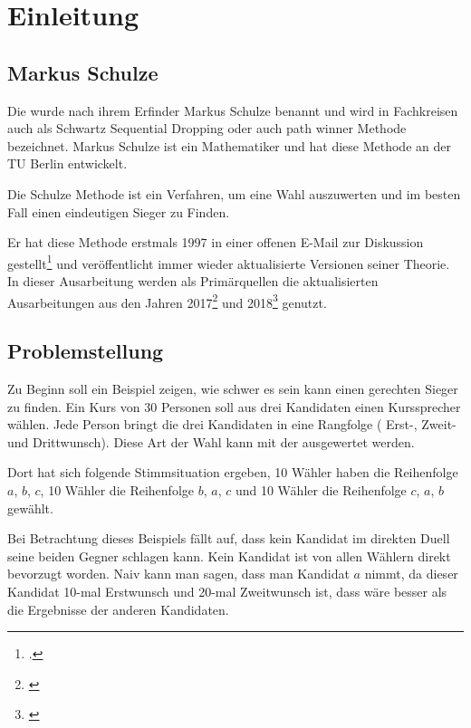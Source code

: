 \section{Einleitung}
\label{sec:Einleitung}


\subsection{Markus Schulze} 
\label{sec:markusSchulze}
Die \schulze wurde nach ihrem Erfinder Markus Schulze benannt und wird in Fachkreisen auch als \glqq Schwartz Sequential Dropping\grqq{} oder auch \glqq path winner\grqq{} Methode bezeichnet. Markus Schulze ist ein Mathematiker und hat diese Methode an der TU Berlin entwickelt.

Die Schulze Methode ist ein Verfahren, um eine Wahl auszuwerten und im besten Fall einen eindeutigen Sieger zu Finden.

Er hat diese Methode erstmals 1997 in einer offenen E-Mail zur Diskussion gestellt\footnote{\Vgl \citet{Schulze1997}.} und veröffentlicht immer wieder aktualisierte Versionen seiner Theorie. In dieser Ausarbeitung werden als Primärquellen  die aktualisierten Ausarbeitungen aus den Jahren 2017\footnote{\Vgl \citet{Schulze2017}} und 2018\footnote{\Vgl \citet{Schulze2018}} genutzt.

\subsection{Problemstellung} 
\label{sec:problemstellungBeispiel}
Zu Beginn soll ein Beispiel zeigen, wie schwer es sein kann einen gerechten Sieger zu finden. Ein Kurs von 30 Personen soll aus drei Kandidaten einen Kurssprecher wählen. Jede Person bringt die drei Kandidaten in eine Rangfolge ( Erst-, Zweit- und Drittwunsch). Diese Art der Wahl kann mit der \schulze ausgewertet werden. 

Dort hat sich folgende Stimmsituation ergeben, 10 Wähler  haben die Reihenfolge $a$, $b$, $c$, 10 Wähler die Reihenfolge $b$, $a$, $c$ und 10 Wähler die Reihenfolge $c$, $a$, $b$ gewählt.

Bei Betrachtung dieses Beispiels fällt auf, dass kein Kandidat im direkten Duell seine beiden Gegner schlagen kann. Kein Kandidat ist von allen Wählern direkt bevorzugt worden. Naiv kann man sagen, dass man Kandidat $a$ nimmt, da dieser Kandidat 10-mal Erstwunsch und 20-mal Zweitwunsch ist, dass wäre besser als die Ergebnisse der anderen Kandidaten. 

